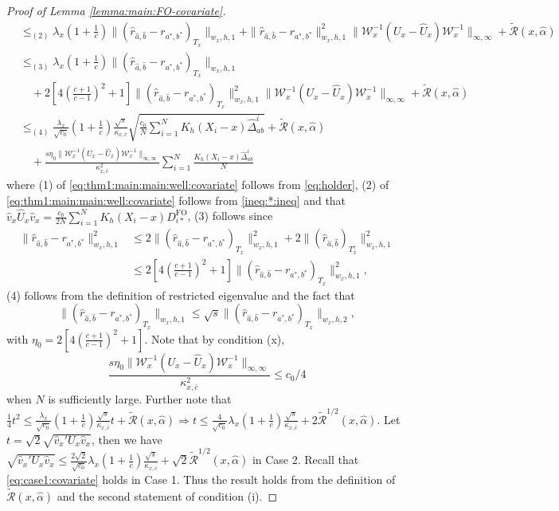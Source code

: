 \documentclass[10pt,a4paper]{amsart}
\begin{document}
\begin{proof}[Proof of Lemma \ref{lemma:main:FO-covariate}]
\begin{equation}
\begin{array}{rl}
&\displaystyle \leq_{(2)} \lambda_x(1+\frac{1}{c})\|(\hat r_{\hat a,\hat b} - r_{a^*,b^*})_{T_x}\|_{w_x,h,1} + \|\hat r_{\hat a,\hat b} - r_{a^*,b^*}\|_{w_x,h,1}^2\! \|\mathcal{W}_x^{-1}(U_x-\hat U_x)\mathcal{W}_x^{-1}\|_{\infty,\infty}+ \widetilde{\mathcal{R}}(x,\hat\alpha)\\
&\displaystyle\leq_{(3)}\lambda_x(1+\frac{1}{c})\|(\hat r_{\hat a,\hat b} - r_{a^*,b^*})_{T_x}\|_{w_x,h,1}\\
&\displaystyle\quad+2\left[4(\frac{c+1}{c-1})^2+1\right]\!\!\|(\hat{r}_{\hat{a},\hat{b}}-r_{a^*,b^*})_{T_x}\|_{w_x,h,1}^2\|\mathcal{W}_x^{-1}(U_x-\hat U_x)\mathcal{W}_x^{-1}\|_{\infty,\infty}+ \widetilde{\mathcal{R}}(x,\hat\alpha)\\
&\displaystyle\leq_{(4)}\frac{\lambda_x}{\sqrt{c_0}}\left(1+\frac{1}{c}\right) \frac{\sqrt{s}}{\kappa_{x,\bar{c}}}\sqrt{\frac{c_0}{N} \sum_{i=1}^NK_h(X_i-x)\hat{\Delta}_{ab}^i} + \widetilde{\mathcal{R}}(x,\hat\alpha)\\
&\displaystyle\quad+\frac{s\eta_0\|\!\mathcal{W}_x^{-1}\!(U_x-\hat U_x)\!\mathcal{W}_x^{-1}\|_{\infty,\infty}}{\kappa_{x,\bar{c}}^2}\sum_{i=1}^N\frac{K_h(X_i-x)\hat{\Delta}_{ab}^i}{N}
\end{array}
\end{equation}
where (1) of \eqref{eq:thm1:main:main:well:covariate} follows from \eqref{eq:holder}, (2) of \eqref{eq:thm1:main:main:well:covariate} follows from \eqref{ineq:*:ineq} and that $\hat{v}_x\hat{U}_x\hat{v}_x=\frac{c_0}{2N} \sum_{i=1}^NK_h(X_i-x)D_{i*}^{\mathrm{FO}}$, (3) follows since 
$$\begin{array}{rl}
\|\hat{r}_{\hat{a},\hat{b}}-r_{a^*,b^*}\|_{w_x,h,1}^2&\displaystyle\leq2\|(\hat{r}_{\hat{a},\hat{b}}-r_{a^*,b^*})_{T_x}\|_{w_x,h,1}^2+2\|(\hat{r}_{\hat{a},\hat{b}})_{T_x^c}\|_{w_x,h,1}^2\\
&\displaystyle\leq2\left[4(\frac{c+1}{c-1})^2+1\right]\|(\hat{r}_{\hat{a},\hat{b}}-r_{a^*,b^*})_{T_x}\|_{w_x,h,1}^2,
\end{array}$$
(4) follows from the definition of restricted eigenvalue and the fact that 
$$\|(\hat{r}_{\hat{a},\hat{b}}-r_{a^*,b^*})_{T_x}\|_{w_x,h,1}\leq\sqrt{s}\|(\hat{r}_{\hat{a},\hat{b}}-r_{a^*,b^*})_{T_x}\|_{w_x,h,2},$$ 
with $\eta_0=2\left[4\left(\frac{c+1}{c-1}\right)^2+1\right]$.
Note that by condition (x), $$\frac{s\eta_0\|\mathcal{W}_x^{-1}(U_x-\hat U_x)\mathcal{W}_x^{-1}\|_{\infty,\infty}}{\kappa_{x,\bar{c}}^2} \leq c_0/4$$ 
when $N$ is sufficiently large. Further note that $\frac{1}{4}t^2 \leq \frac{\lambda_x}{\sqrt{c_0}}(1+\frac{1}{c})\frac{\sqrt{s}}{\kappa_{x,\bar{c}}} t + \mathcal{\widetilde{R}}(x,\hat \alpha) \Rightarrow t \leq\frac{4}{\sqrt{c_0}}\lambda_x(1+\frac{1}{c})\frac{\sqrt{s}}{\kappa_{x,\bar{c}}} + 2{\mathcal{\widetilde{R}}}^{1/2}(x,\hat \alpha)$. Let $t=\sqrt{2}\sqrt{\hat{v}_x'U_x\hat{v}_x}$, then we have $\sqrt{\hat{v}_x'U_x\hat{v}_x}\leq\frac{2\sqrt{2}}{\sqrt{c_0}}\lambda_x(1+\frac{1}{c})\frac{\sqrt{s}}{\kappa_{x,\bar{c}}} + \sqrt{2}{\mathcal{\widetilde{R}}}^{1/2}(x,\hat \alpha)$ in Case 2. Recall that \eqref{eq:case1:covariate} holds in Case 1. Thus the result holds from the definition of $\widetilde{\mathcal{R}}(x,\hat{\alpha})$ and the second statement of condition (i). 
\end{proof}
\end{document}
